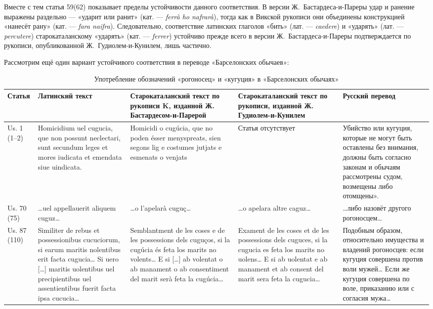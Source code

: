 Вместе с тем статья 59(62) показывает пределы устойчивости данного соответствия. В версии Ж.~Бастардеса-и-Пареры удар и ранение выражены раздельно --- «ударит или ранит» (кат. --- \emph{ferrà ho nafrarà}), тогда как в Викской рукописи они объединены конструкцией «нанесёт рану» (кат. --- \emph{fara naifra}). Следовательно, соответствие латинских глаголов «бить» (лат. --- \emph{caedere}) и «ударять» (лат. --- \emph{percutere}) старокаталанскому «ударять» (кат. --- \emph{ferrer}) устойчиво прежде всего в версии Ж.~Бастардеса-и-Пареры подтверждается по рукописи, опубликованной Ж.~Гудиолем-и-Кунилем, лишь частично.

Рассмотрим ещё один вариант устойчивого соответствия в переводе «Барселонских обычаев»:

\begin{center}
\small
\setlength{\tabcolsep}{2pt}
\begin{longtable}{|p{}|p{}|p{}|p{}|p{}|}
\caption{Употребление обозначений «рогоносец» и «кугуция» в «Барселонских обычаях»}\label{tab:ch2-cugucia}\\
\hline
\textbf{Статья} & \textbf{Латинский текст} & \textbf{Старокаталанский текст по рукописи K, изданной Ж. Бастардесом-и-Парерой} & \textbf{Старокаталанский текст }\textbf{по рукописи, }\textbf{изданной Ж. Гудиолем-и-Кунилем} & \textbf{Русский перевод} \\ \hline
Us. 1 (1--2) & Homicidium uel cugucia, que non possunt neclectari, sunt secundum leges et mores iudicata et emendata siue uindicata. & Homicidi o cugúcia, que no poden ésser menyspreats, sien segons lig e costumes jutjats e esmenats o venjats & Статья отсутствует & Убийство или кугуция, которые не могут быть оставлены без внимания, должны быть согласно законам и обычаям рассмотрены судом, возмещены либо отомщены». \\ \hline
Us. 70 (75) & …uel appellauerit aliquem cuguz… & …o l’apelarà cuguç… & …o apelara altre caguz… & …либо назовёт другого рогоносцем… \\ \hline
Us. 87 (110) & Similiter de rebus et possessionibus cucuciorum, si earum maritis nolentibus erit facta cugucia… Si uero […] maritis uolentibus uel precipientibus uel assentientibus fuerit facta ipsa cucucia… & Semblantment de les coses e de les possessions dels cuguços, si la cugúcia és feta los marits no volents… E si […] ab volentat o ab manament o ab consentiment del marit serà feta la cugúcia… & Exament de les coses et de les possessions dels cuguces, si la cugucia es feta los marits no uolens… E si ab uolentat e ab manament et ab consent del marit sera feta la cugucia… & Подобным образом, относительно имущества и владений рогоносцев: если кугуция совершена против воли мужей… Если же кугуция совершена по воле, приказанию или с согласия мужа… \\ \hline
\end{longtable}
\end{center}

